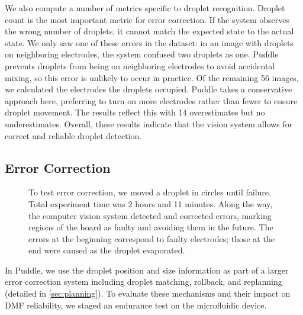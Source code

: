 \documentclass[sigplan, screen]{acmart}
\begin{document}
We also compute a number of metrics specific to droplet recognition.
Droplet count is the most important metric for error correction.
If the system observes the wrong number of droplets, it cannot match the expected state to the actual state.
We only saw one of these errors in the dataset: in an image with droplets on neighboring electrodes, the system confused two droplets as one.
Puddle prevents droplets from being on neighboring electrodes to avoid accidental mixing, so this error is unlikely to occur in practice.
Of the remaining 56 images, we calculated the electrodes the droplets occupied.
Puddle takes a conservative approach here, preferring to turn on more electrodes rather than fewer to ensure droplet movement.
The results reflect this with 14 overestimates but no underestimates.
Overall, these results indicate that the vision system allows for correct and reliable droplet detection.

\subsection{Error Correction}
\label{sec:endurance}

\begin{figure}
  \centering
  \caption{
    To test error correction, we moved a droplet in circles until failure.
    Total experiment time was 2 hours and 11 minutes.
    Along the way, the computer vision system detected and corrected errors, marking regions of the board as faulty and avoiding them in the future.
    The errors at the beginning correspond to faulty electrodes; those at the end were caused as the droplet evaporated.
  }
  \label{fig:endurance}
\end{figure}

In Puddle, we use the droplet position and size information as part of a larger error correction system including droplet matching, rollback, and replanning (detailed in \autoref{sec:planning}).
To evaluate these mechanisms and their impact on DMF reliability, we staged an endurance test on the microfluidic device.
\end{document}
